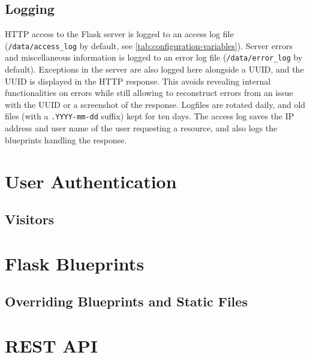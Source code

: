 \subsection{Logging}
\label{sec:logging}

HTTP access to the Flask server is logged to an access log file (\verb!/data/access_log! by default, see \cref{tab:configuration-variables}).
Server errors and miscellaneous information is logged to an error log file (\verb!/data/error_log! by default).
Exceptions in the server are also logged here alongside a UUID, and the UUID is displayed in the HTTP response.
This avoids revealing internal functionalities on errors while still allowing to reconstruct errors from an issue with the UUID or a screenshot of the response.
Logfiles are rotated daily, and old files (with a \verb!.YYYY-mm-dd! suffix) kept for ten days.
The access log saves the IP address and user name of the user requesting a resource, and also logs the blueprints handling the response.


\section{User Authentication}
\label{sec:user-authentication}


\subsection{Visitors}
\label{sec:visitors}


\section{Flask Blueprints}


\subsection{Overriding Blueprints and Static Files}
\label{sec:override-blueprints}


\section{REST API}
\label{sec:rest-api}

